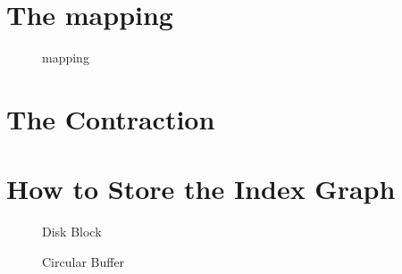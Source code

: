 \section{The mapping}

\begin{figure}
    \centering
    
    \caption{mapping}
    \label{fig:mapping}
\end{figure}

\section{The Contraction}

\section{How to Store the Index Graph}

\begin{figure}
    \centering
    
    \caption{Disk Block}
    \label{fig:disk_block}
\end{figure}

\begin{figure}
    \centering
    
    \caption{Circular Buffer}
    \label{fig:circular_buffer}
\end{figure}
